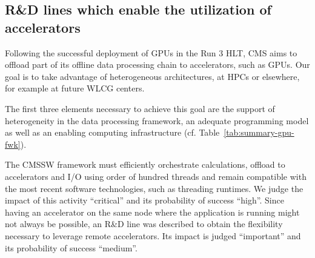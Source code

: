 \documentclass{cmspaper}
\begin{document}

\subsection{R\&D lines which enable the utilization of accelerators}

Following the successful deployment of GPUs in the Run 3 HLT, CMS aims to offload part of its offline data processing chain to accelerators, such as GPUs. Our goal is to take advantage of heterogeneous architectures, at HPCs or elsewhere, for example at future WLCG centers.

The first three elements necessary to achieve this goal are the support of heterogeneity in the data processing framework, an adequate programming model as well as an enabling computing infrastructure (cf. Table~\ref{tab:summary-gpu-fwk}).

The CMSSW framework must efficiently orchestrate calculations, offload to accelerators and I/O using order of hundred threads and remain compatible with the most recent software technologies, such as threading runtimes. We judge the impact of this activity ``critical'' and its probability of success ``high''. Since having an accelerator on the same node where the application is running might not always be possible, an R\&D line was described to obtain the flexibility necessary to leverage remote accelerators. Its impact is judged ``important'' and its probability of success ``medium''.
\end{document}
